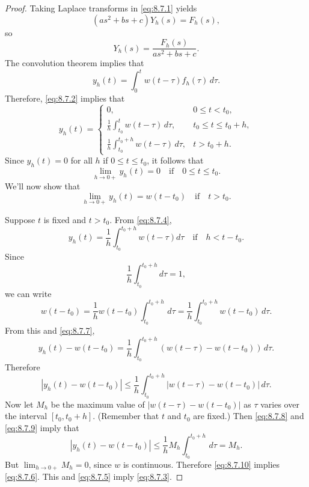 \documentclass{ximera}
\begin{document}
\begin{proof}
Taking Laplace transforms in \eqref{eq:8.7.1} yields
$$
(as^2+bs+c)Y_h(s)=F_h(s),
$$
so
$$
Y_h(s)=\frac{F_h(s)}{as^2+bs+c}.
$$
The convolution theorem implies that
$$
y_h(t)=\int_0^t w(t-\tau)f_h(\tau)\,d\tau.
$$
Therefore,  \eqref{eq:8.7.2} implies that
\begin{equation} \label{eq:8.7.4}
y_h(t)=\left\{\begin{array}{cl} 0,&0\leq t<t_0,\\
\frac{1}{h}\int_{t_0}^tw(t-\tau)\,d\tau,&t_0\leq t\leq
t_0+h,\\
\frac{1}{h}\int_{t_0}^{t_0+h}w(t-\tau)\,d\tau,&t>t_0+h.\end{array}\right.
\end{equation}
Since $y_h(t)=0$ for all $h$ if $0\leq t\leq t_0$, it follows that
\begin{equation} \label{eq:8.7.5}
\lim_{h\to0+}y_h(t)=0 \quad\mbox{if}\quad 0\leq t\leq t_0.
\end{equation}
We'll now show that
\begin{equation} \label{eq:8.7.6}
\lim_{h\rightarrow0+}y_h(t)=w(t-t_0)\quad\mbox{if}\quad t>t_0.
\end{equation}

Suppose   $t$ is fixed and $t>t_0$.
From
\eqref{eq:8.7.4},
\begin{equation} \label{eq:8.7.7}
y_h(t)=\frac{1}{h}\int_{t_0}^{t_0+h}w(t-\tau)d\tau\quad\mbox{if}\quad
h<t-t_0.
\end{equation}
Since
\begin{equation} \label{eq:8.7.8}
\frac{1}{h}\int_{t_0}^{t_0+h}d\tau=1,
\end{equation}
we can write
$$
w(t-t_0)=\frac{1}{h}w(t-t_0)\int_{t_0}^{t_0+h}\,d\tau=
\frac{1}{h}\int_{t_0}^{t_0+h}w(t-t_0)\,d\tau.
$$
From this and \eqref{eq:8.7.7},
$$
y_h(t)-w(t-t_0)=
\frac{1}{h}\int_{t_0}^{t_0+h}\left(w(t-\tau)-w(t-t_0)\right)\,d\tau.
$$
Therefore
\begin{equation} \label{eq:8.7.9}
|y_h(t)-w(t-t_0)|\leq
\frac{1}{h}\int_{t_0}^{t_0+h}|w(t-\tau)-w(t-t_0)|\,d\tau.
\end{equation}
Now let $M_h$ be the maximum value of $|w(t-\tau)-w(t-t_0)|$ as $\tau$
varies over the interval $[t_0,t_0+h]$. (Remember that $t$ and $t_0$
are fixed.) Then \eqref{eq:8.7.8} and \eqref{eq:8.7.9} imply that
\begin{equation} \label{eq:8.7.10}
|y_h(t)-w(t-t_0)|\leq
\frac{1}{h}M_h\int_{t_0}^{t_0+h}\,d\tau=M_h.
\end{equation}
But $\lim_{h\rightarrow0+}M_h=0$, since $w$ is continuous.
Therefore \eqref{eq:8.7.10} implies \eqref{eq:8.7.6}.
This and \eqref{eq:8.7.5} imply \eqref{eq:8.7.3}. 
\end{proof}
\end{document}
